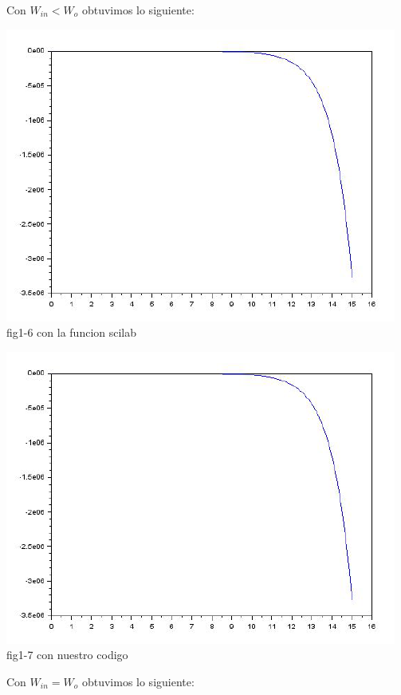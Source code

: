 \documentclass[12pt,a4paper]{IEEEtran}
\begin{document}
Con $W_{in}<W_{o}$ obtuvimos lo siguiente:

\begin{center}
	\includegraphics[scale = 0.6]{images/funcionscilab2}\\
	{fig1-6 con la funcion scilab}
\end{center}


\begin{center}
	\includegraphics[scale = 0.6]{images/funcionscilab2}\\
	{fig1-7 con nuestro codigo}
\end{center}

Con $W_{in}=W_{o}$ obtuvimos lo siguiente: 
\end{document}
